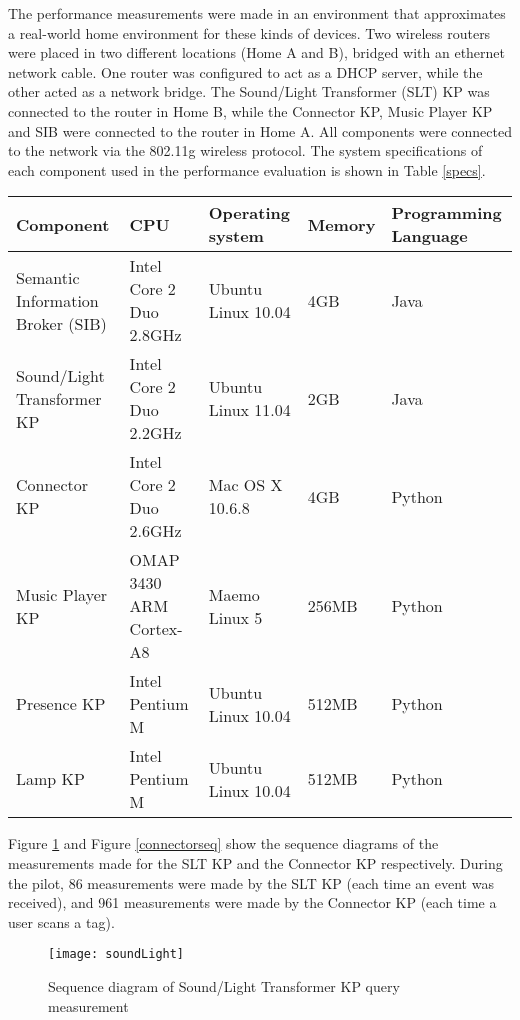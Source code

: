 The performance measurements were made in an environment that approximates a real-world home environment for these kinds of devices. Two wireless routers were placed in two different locations (Home A and B), bridged with an ethernet network cable. One router was configured to act as a DHCP server, while the other acted as a network bridge. The Sound/Light Transformer (SLT) KP was connected to the router in Home B, while the Connector KP, Music Player KP and SIB were connected to the router in Home A. All components were connected to the network via the 802.11g wireless protocol. The system specifications of each component used in the performance evaluation is shown in Table \ref{specs}.

\begin{table*}[!t]
\caption{System specifications of components used in measurement evaluation}
\label{specs}
\centering
\begin{tabular}{|l|l|l|l|l|}
\hline
Component & CPU & Operating system & Memory & Programming Language \\
\hline
Semantic Information Broker (SIB) & Intel Core 2 Duo 2.8GHz & Ubuntu Linux 10.04 & 4GB & Java \\
Sound/Light Transformer KP & Intel Core 2 Duo 2.2GHz & Ubuntu Linux 11.04 & 2GB & Java\\
Connector KP & Intel Core 2 Duo 2.6GHz & Mac OS X 10.6.8 & 4GB & Python\\
Music Player KP & OMAP 3430 ARM Cortex-A8 & Maemo Linux 5 & 256MB & Python\\
Presence KP  & Intel Pentium M & Ubuntu Linux 10.04 & 512MB & Python\\
Lamp KP  & Intel Pentium M & Ubuntu Linux 10.04 & 512MB & Python\\
\hline
\end{tabular}
\end{table*}

Figure \ref{soundLight} and Figure \ref{connectorseq} show the sequence diagrams of the measurements made for the SLT KP and the Connector KP respectively. During the pilot, 86 measurements were made by the SLT KP (each time an event was received), and 961 measurements were made by the Connector KP (each time a user scans a tag).

\begin{figure}
\centering
\texttt{[image: soundLight]}
\caption{Sequence diagram of Sound/Light Transformer KP query measurement}
\label{soundLight}
\end{figure}


